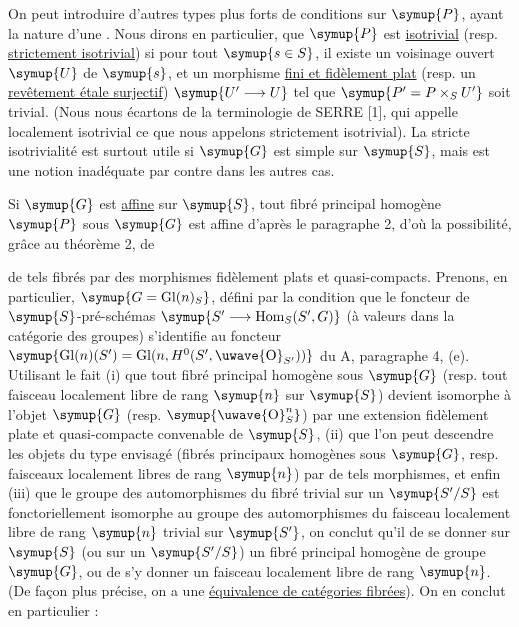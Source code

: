 On peut introduire d'autres types plus forts de conditions sur $\symup{P}$, ayant la
nature d'une . Nous dirons en particulier, que $\symup{P}$ est
\uline{isotrivial} (resp. \uline{strictement isotrivial}) si pour tout $\symup{s\in S}$, il existe un
voisinage ouvert $\symup{U}$ de $\symup{s}$, et un morphisme \uline{fini et fidèlement plat} (resp. un
\uline{revêtement étale surjectif}) $\symup{U'\longrightarrow U}$ tel que
$\symup{P'=P\times_SU'}$ soit trivial. (Nous nous écartons de la terminologie de SERRE
[1], qui appelle localement isotrivial ce que nous appelons strictement
isotrivial). La stricte isotrivialité est surtout utile si $\symup{G}$ est simple sur
$\symup{S}$, mais est une notion inadéquate par contre dans les autres cas.

Si $\symup{G}$ est \uline{affine} sur $\symup{S}$, tout fibré principal homogène $\symup{P}$ sous $\symup{G}$ est
affine d'après le paragraphe 2, d'où la possibilité, grâce au théorème 2, de

de tels fibrés par des morphismes fidèlement plats et quasi-compacts. Prenons,
en particulier, $\symup{G=\operatorname{Gl}(n)_S}$, défini par la condition que le
foncteur de $\symup{S}$-pré-schémas
$\symup{S'\longrightarrow\operatorname{Hom}_S(S',G)}$
(à valeurs dans la catégorie des groupes) s'identifie au foncteur
$\symup{\operatorname{Gl}(n)(S')=\operatorname{Gl}(n,H^0(S',\text{\uwave{O}}_{S'}))}$
du A, paragraphe 4, (e). Utilisant le fait (i) que tout fibré principal homogène
sous $\symup{G}$ (resp. tout faisceau localement libre de rang $\symup{n}$ sur $\symup{S}$) devient
isomorphe à l'objet  $\symup{G}$ (resp. $\symup{\text{\uwave{O}}_S^n}$) par une extension
fidèlement plate et quasi-compacte convenable de $\symup{S}$, (ii) que l'on peut
descendre les objets du type envisagé (fibrés principaux homogènes sous $\symup{G}$,
resp. faisceaux localement libres de rang $\symup{n}$) par de tels morphismes, et enfin
(iii) que le groupe des automorphismes du fibré trivial sur un $\symup{S'/S}$ est
fonctoriellement isomorphe au groupe des automorphismes du faisceau localement
libre de rang $\symup{n}$ trivial sur $\symup{S'}$, on conclut  qu'il  de se donner sur $\symup{S}$ (ou sur un $\symup{S'/S}$) un fibré principal homogène
de groupe $\symup{G}$, ou de s'y donner un faisceau localement libre de rang $\symup{n}$. (De
façon plus précise, on a une \uline{équivalence de catégories fibrées}). On en conclut
en particulier :

